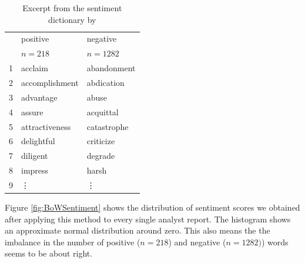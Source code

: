 \begin{table}[ht]
\centering
\begin{tabular}{rll}
  \hline
 & positive & negative \\ 
 & $n = 218$ & $n = 1282$ \\ 
  \hline
  1 & acclaim & abandonment \\ 
  2 & accomplishment & abdication \\ 
  3 & advantage & abuse \\ 
  4 & assure & acquittal \\ 
  5 & attractiveness & catastrophe \\ 
  6 & delightful & criticize \\ 
  7 & diligent & degrade \\ 
  8 & impress & harsh \\ 
  9 & \vdots & \vdots \\ 
   \hline
\end{tabular}
\caption{Excerpt from the sentiment dictionary by 
\citet{sent_dictionary}}
\label{tab:sent_dic}
\end{table}
Figure \ref{fig:BoWSentiment} shows the distribution of sentiment scores we obtained after applying this method to every single analyst report. The histogram shows an approximate normal distribution around zero. This also means the the imbalance in the number of positive ($n = 218$) and negative ($n = 1282)$) words seems to be about right.
